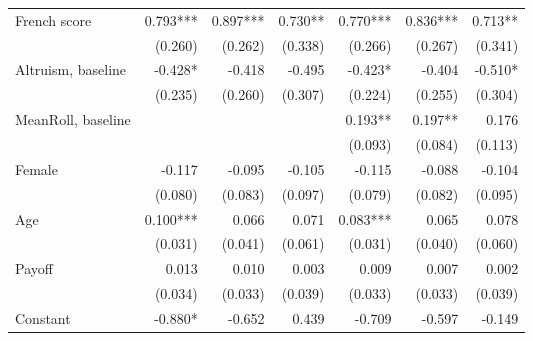 \begin{table}[htbp]
\begin{adjustbox}{width=1\textwidth}
\begin{threeparttable}
\begin{tabular}{l*{6}{D{.}{.}{-1}}}
French score        &               0.793***&               0.897***&               0.730** &               0.770***&               0.836***&               0.713** \\
                    &             (0.260)   &             (0.262)   &             (0.338)   &             (0.266)   &             (0.267)   &             (0.341)   \\
Altruism, baseline  &              -0.428*  &              -0.418   &              -0.495   &              -0.423*  &              -0.404   &              -0.510*  \\
                    &             (0.235)   &             (0.260)   &             (0.307)   &             (0.224)   &             (0.255)   &             (0.304)   \\
MeanRoll, baseline  &                       &                       &                       &               0.193** &               0.197** &               0.176   \\
                    &                       &                       &                       &             (0.093)   &             (0.084)   &             (0.113)   \\
Female              &              -0.117   &              -0.095   &              -0.105   &              -0.115   &              -0.088   &              -0.104   \\
                    &             (0.080)   &             (0.083)   &             (0.097)   &             (0.079)   &             (0.082)   &             (0.095)   \\
Age                 &               0.100***&               0.066   &               0.071   &               0.083***&               0.065   &               0.078   \\
                    &             (0.031)   &             (0.041)   &             (0.061)   &             (0.031)   &             (0.040)   &             (0.060)   \\
Payoff              &               0.013   &               0.010   &               0.003   &               0.009   &               0.007   &               0.002   \\
                    &             (0.034)   &             (0.033)   &             (0.039)   &             (0.033)   &             (0.033)   &             (0.039)   \\
Constant            &              -0.880*  &              -0.652   &               0.439   &              -0.709   &              -0.597   &              -0.149   \\

\end{tabular}
\end{threeparttable}
\end{adjustbox}
\end{table}
